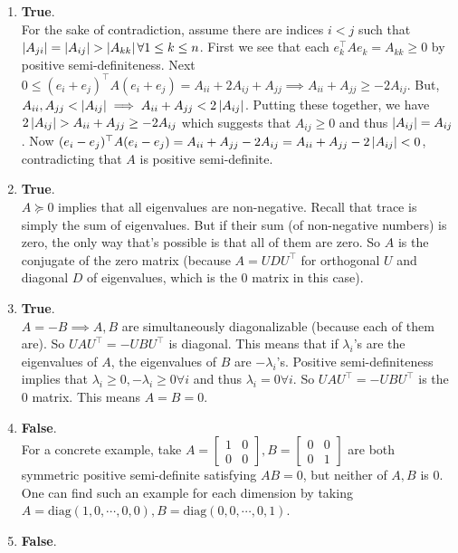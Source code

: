 \begin{enumerate}[leftmargin=*]
\item \textbf{True}.\\
For the sake of contradiction, assume there are indices $i< j$ such that $\abs{A_{ji}}=\abs{A_{ij}}>\abs{A_{kk}}\forall 1\leq k\leq n$. First we see that each $e_k^\top Ae_k = A_{kk}\geq 0$ by positive semi-definiteness. Next $0\leq (e_i+e_j)^\top A (e_i+e_j) = A_{ii} + 2A_{ij} + A_{jj}\implies A_{ii}+ A_{jj} \ge-2A_{ij}$. But, $A_{ii}, A_{jj} < \left| A_{ij} \right|\implies A_{ii}+A_{jj} < 2 \left| A_{ij} \right|$. Putting these together, we have $2\left| A_{ij} \right| > A_{ii} + A_{jj} \ge -2A_{ij}$ which suggests that $A_{ij}\ge 0$ and thus $\left| A_{ij} \right|=A_{ij}$. Now $(e_i-e_j)^\top A(e_i-e_j) = A_{ii} + A_{jj} - 2A_{ij} = A_{ii} + A_{jj} - 2\left| A_{ij} \right| < 0$, contradicting that $A$ is positive semi-definite.
\item \textbf{True}.\\
$A\succeq 0$ implies that all eigenvalues are non-negative. Recall that trace is simply the sum of eigenvalues. But if their sum (of non-negative numbers) is zero, the only way that's possible is that all of them are zero. So $A$ is the conjugate of the zero matrix (because $A = UDU^\top$ for orthogonal $U$ and diagonal $D$ of eigenvalues, which is the $0$ matrix in this case).
\item \textbf{True}.\\
$A=-B\implies A,B$ are simultaneously diagonalizable (because each of them are). So $UAU^\top = -UBU^\top$ is diagonal. This means that if $\lambda_i$'s are the eigenvalues of $A$, the eigenvalues of $B$ are $-\lambda_i$'s. Positive semi-definiteness implies that $\lambda_i\geq 0, -\lambda_i\geq 0\forall i$ and thus $\lambda_i = 0\forall i$. So $UAU^\top = -UBU^\top$ is the $0$ matrix. This means $A=B=0$.
\item \textbf{False}.\\
For a concrete example, take $A = \begin{bmatrix}1&0\\0&0\end{bmatrix}, B = \begin{bmatrix}0&0\\0&1\end{bmatrix}$ are both symmetric positive semi-definite satisfying $AB=0$, but neither of $A,B$ is $0$. One can find such an example for each dimension by taking $A=\text{diag}(1,0,\cdots,0,0), B=\text{diag}(0,0,\cdots,0,1)$.
\item \textbf{False}.\\

\end{enumerate}
